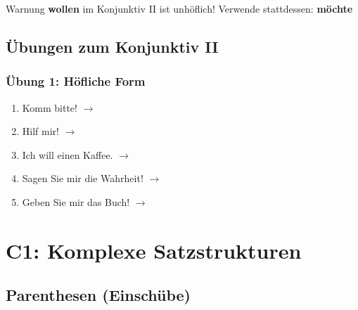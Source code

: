\begin{warnbox}{Warnung}
\textbf{wollen} im Konjunktiv II ist unhöflich! Verwende stattdessen: \textbf{möchte}
\end{warnbox}

\section{Übungen zum Konjunktiv II}
\label{sec:B2KonjIIUebungen}

\subsection*{Übung 1: Höfliche Form}
\begin{enumerate}
    \item Komm bitte! $\rightarrow$ \underline{\hspace{2cm}}
    \item Hilf mir! $\rightarrow$ \underline{\hspace{2cm}}
    \item Ich will einen Kaffee. $\rightarrow$ \underline{\hspace{2cm}}
    \item Sagen Sie mir die Wahrheit! $\rightarrow$ \underline{\hspace{2cm}}
    \item Geben Sie mir das Buch! $\rightarrow$ \underline{\hspace{2cm}}
\end{enumerate}


\chapterend

\chapter{C1: Komplexe Satzstrukturen}
\label{cha:C1Komplex}

\section{Parenthesen (Einschübe)}
\label{sec:C1Parenthese}

